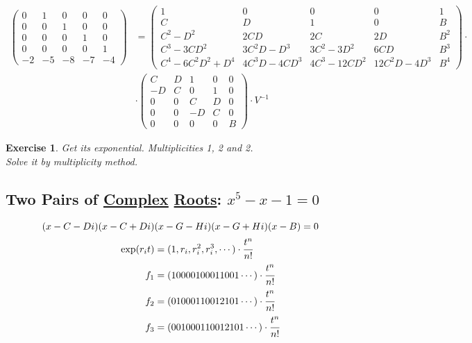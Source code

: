 \documentclass[12pt,a4paper]{article}
\newtheorem{exercise}{Exercise}[section]
\begin{document}
\begin{align}
\left( \begin{matrix} 0&1&0&0&0 \\ 0&0&1&0&0 \\ 0&0&0&1&0 \\ 0&0&0&0&1 \\ -2 & -5 & -8 & -7 & -4 \end{matrix} \right)
&=
\left( \begin{matrix} 1 & 0 & 0 & 0 & 1 \\ C & D & 1 & 0 & B \\ C^2-D^2 & 2CD & 2C & 2D & B^2 \\ C^3-3CD^2 & 3C^2D - D^3 & 3C^2-3D^2 & 6CD & B^3 \\  C^4-6C^2D^2+D^4&4C^3D-4CD^3  & 4C^3-12CD^2 & 12C^2D - 4D^3  & B^4  \end{matrix} \right) \cdot \nonumber \\
&\cdot \left( \begin{matrix} C & D&1&0&0 \\ -D & C&0&1&0 \\ 0 & 0 & C & D & 0 \\ 0 & 0 & -D & C & 0 \\ 0 & 0 & 0 & 0 & B \end{matrix} \right) \cdot V^{-1}
\end{align}

\begin{exercise}
Get its exponential. Multiplicities 1, 2 and 2. \\
Solve it by multiplicity method.
\end{exercise}

\subsection{Two Pairs of \href{https://www.wolframalpha.com/input/?i=x\%5E5+-+x+-+1+\%3D+0 }{\color{blue}\underline{Complex}} \href{}{Roots}: $x^5 - x - 1 = 0$}

\begin{align}
(x - C - Di)(x - C + Di)&(x - G - Hi)(x - G + Hi)(x - B) = 0 \\
\exp(r_i t) &= (1, r_i, r_i^2, r_i^3, \cdots) \cdot\cfrac{t^n}{n!} \\
f_1 &= (10000100011001\cdots) \cdot\cfrac{t^n}{n!} \\
f_2 &= (01000110012101\cdots) \cdot\cfrac{t^n}{n!} \\
f_3 &= (001000110012101\cdots) \cdot\cfrac{t^n}{n!}
\end{align}
\end{document}
